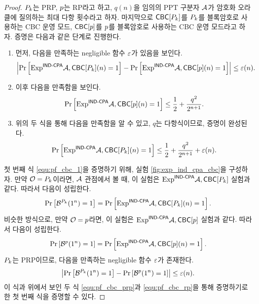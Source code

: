 \begin{proof}
  $P_{k}$는 PRP, $p$는 RP라고 하고, $q(n)$을 임의의 PPT 구분자 $\mathcal{A}$가 암호화
  오라클에 질의하는 최대 다항 횟수라고 하자. 마지막으로 $\textsf{CBC}[P_{k}]$를 $P_{k}$를 블록암호로
  사용하는 CBC 운영 모드, $\textsf{CBC}[p]$를 $p$를 블록암호로 사용하는 CBC 운영 모드라고 하자.
  증명은 다음과 같은 단계로 진행한다.
  \begin{enumerate}
    \item 먼저, 다음을 만족하는 negligible 함수 $\varepsilon$가 있음을 보인다.
          \begin{equation} \label{equ:pf_cbc_1}
            \left| 
              \text{Pr} \left[ \text{Exp}^{\textsf{IND-CPA}}{\mathcal{A}, \textsf{CBC}[P_{k}]}(n) = 1 \right] -
              \text{Pr} \left[ \text{Exp}^{\textsf{IND-CPA}}{\mathcal{A}, \textsf{CBC}[p]}(n) = 1 \right]
             \right| \le \varepsilon(n).
          \end{equation}
    \item 이후 다음을 만족함을 보인다.
          \begin{equation} \label{equ:pf_cbc_2}
            \text{Pr} \left[ \text{Exp}^{\textsf{IND-CPA}}{\mathcal{A}, \textsf{CBC}[p]}(n) = 1 \right]
            \le \frac{1}{2} + \frac{q^2}{2^{n + 1}}.
          \end{equation}
    \item 위의 두 식을 통해 다음을 만족함을 알 수 있고, $q$는 다항식이므로, 증명이 완성된다.
          \begin{equation}
            \text{Pr} \left[ \text{Exp}^{\textsf{IND-CPA}}{\mathcal{A}, \textsf{CBC}[P_{k}]}(n) = 1 \right]
            \le \frac{1}{2} + \frac{q^2}{2^{n + 1}} + \varepsilon(n).
          \end{equation}
  \end{enumerate}

  첫 번째 식 \ref{equ:pf_cbc_1}을 증명하기 위해, 실험 \ref{fig:exp_ind_cpa_cbc}을
  구성하자. 만약 $\mathcal{O} = P_{k}$이라면, $\mathcal{A}$ 관점에서 볼 때, 이 실험은
  $\text{Exp}^{\textsf{IND-CPA}}{\mathcal{A}, \textsf{CBC}[P_{k}]}$ 실험과 같다. 따라서 다음이 성립한다.
  \begin{equation} \label{equ:pf_cbc_prp}
    \text{Pr} \left[ \mathcal{B}^{P_{k}}(1^n) = 1 \right] = \text{Pr} \left[ \text{Exp}^{\textsf{IND-CPA}}{\mathcal{A}, \textsf{CBC}[P_{k}]}(n) = 1 \right].
  \end{equation}
  비슷한 방식으로, 만약 $\mathcal{O} = p$라면, 이 실험은 $\text{Exp}^{\textsf{IND-CPA}}{\mathcal{A}, \textsf{CBC}[p]}$ 실험과 같다.
  따라서 다음이 성립한다.
  \begin{equation} \label{equ:pf_cbc_rp}
    \text{Pr} \left[ \mathcal{B}^{p}(1^n) = 1 \right] = \text{Pr} \left[ \text{Exp}^{\textsf{IND-CPA}}{\mathcal{A}, \textsf{CBC}[p]}(n) = 1 \right].
  \end{equation}
  $P_{k}$는 PRP이므로, 다음을 만족하는 negligible 함수 $\varepsilon$가 존재한다.
  \begin{equation}
    \left| 
      \text{Pr} \left[ \mathcal{B}^{P_{k}}(1^n) = 1 \right] - \text{Pr} \left[ \mathcal{B}^{p}(1^n) = 1 \right]
     \right| \le \varepsilon(n).
  \end{equation}
  이 식과 위에서 보인 두 식 \ref{equ:pf_cbc_prp}과 \ref{equ:pf_cbc_rp}을 통해 증명하기로한
  첫 번째 식을 증명할 수 있다.


\end{proof}
